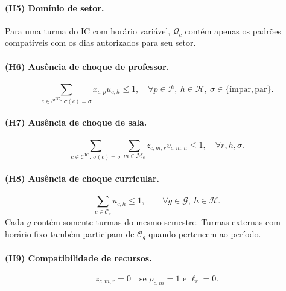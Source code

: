 \paragraph{(H5) Domínio de setor.} Para uma turma do IC com horário variável, $\mathcal{Q}_c$ contém apenas os padrões compatíveis com os dias autorizados para seu setor. 

\paragraph{(H6) Ausência de choque de professor.}
\begin{equation}
    \sum_{c\in\mathcal{C}^{\mathrm{IC}}:\,\sigma(c)=\sigma}x_{c,p}u_{c,h}\leq1,
    \quad \forall p\in\mathcal{P},\ h\in\mathcal{H},\ \sigma\in\{\text{ímpar},\text{par}\}.
\end{equation}

\paragraph{(H7) Ausência de choque de sala.}
\begin{equation}
    \sum_{c\in\mathcal{C}^{\mathrm{IC}}:\,\sigma(c)=\sigma}
    \sum_{m\in\mathcal{M}_c}z_{c,m,r}v_{c,m,h}\leq1,
    \quad \forall r,h,\sigma.
\end{equation}

\paragraph{(H8) Ausência de choque curricular.}
\begin{equation}
    \sum_{c\in\mathcal{C}_g}u_{c,h}\leq1,
    \qquad \forall g\in\mathcal{G},\ h\in\mathcal{H}.
\end{equation}
Cada $g$ contém somente turmas do mesmo semestre. Turmas externas com horário fixo também participam de $\mathcal{C}_g$ quando pertencem ao período.

\paragraph{(H9) Compatibilidade de recursos.}
\begin{equation}
    z_{c,m,r}=0\quad\text{se }\rho_{c,m}=1\text{ e }\ell_r=0.
\end{equation}

